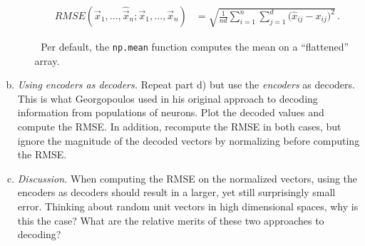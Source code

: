 \begin{enumerate}[a)]
\begin{itemize}
\begin{align*}
				\mathit{RMSE}(\hat{\vec x}_1, \ldots, \hat{\vec x}_n; \vec x_1, \ldots, \vec x_n)
					&= \sqrt{ \frac{1}{nd} \sum_{i=1}^n \sum_{j=1}^d \big({\hat x}_{i j} - x_{ij}\big)^2 } \,.
			\end{align*}
			\item[{\symbolfont 🐍}] Per default, the \texttt{np.mean} function computes the mean on a \enquote{flattened} array.
		\end{itemize}
		\item {} \textit{Using encoders as decoders.} Repeat part d) but use the \textit{encoders} as decoders. This is what Georgopoulos used in his original approach to decoding information from populations of neurons. Plot the decoded values and compute the RMSE. In addition, recompute the RMSE in both cases, but ignore the magnitude of the decoded vectors by normalizing before computing the RMSE.
		\item {} \textit{Discussion.} When computing the RMSE on the normalized vectors, using the encoders as decoders should result in a larger, yet still surprisingly small error. Thinking about random unit vectors in high dimensional spaces, why is this the case? What are the relative merits of these two approaches to decoding?
	\end{enumerate}


